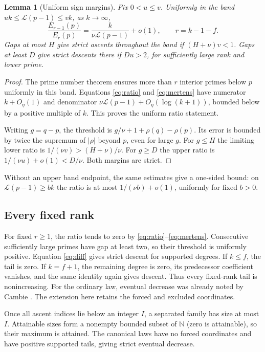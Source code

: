 \documentclass[11pt]{article}
\newtheorem{lemma}[theorem]{Lemma}
\theoremstyle{definition}
\newcommand{\LL}{\mathcal L}
\newcommand{\N}{\mathbb N}
\begin{document}
\begin{lemma}[Uniform sign margins]\label{lem:bands}
Fix $0<u\le v$. Uniformly in the band
$uk\le\LL(p-1)\le vk$, as $k\to\infty$,
\[
 \frac{E_{r-1}(p)}{E_r(p)}
       =\frac{k}{\nu\LL(p-1)}+o(1),\qquad r=k-1-f.
\]
Gaps at most $H$ give strict ascents throughout the band if
$(H+\nu)v<1$. Gaps at least $D$ give strict descents there if
$Du>2$, for sufficiently large rank and lower prime.
\end{lemma}
\begin{proof}
The prime number theorem ensures more than $r$ interior primes
below $p$ uniformly in this band. Equations \eqref{eq:ratio} and
\eqref{eq:mertens} have numerator $k+O_\eta(1)$ and denominator
$\nu\LL(p-1)+O_\eta(\log(k+1))$, bounded below by a positive
multiple of $k$. This proves the uniform ratio statement.

Writing $g=q-p$, the threshold is
$g/\nu+1+\rho(q)-\rho(p)$. Its error is bounded by twice the
supremum of $|\rho|$ beyond $p$, even for large $g$.
For $g\le H$ the limiting lower ratio is
$1/(\nu v)>(H+\nu)/\nu$.
For $g\ge D$ the upper ratio is
$1/(\nu u)+o(1)<D/\nu$. Both margins are strict.
\end{proof}
Without an upper band endpoint, the same estimates give a
one-sided bound: on $\LL(p-1)\ge bk$ the ratio is at most
$1/(\nu b)+o(1)$, uniformly for fixed $b>0$.

\subsection{Every fixed rank}
For fixed $r\ge1$, the ratio tends to zero by
\eqref{eq:ratio}--\eqref{eq:mertens}. Consecutive sufficiently large
primes have gap at least two, so their threshold is uniformly
positive. Equation \eqref{eq:diff} gives strict descent for
supported degrees. If $k\le f$, the tail is zero. If $k=f+1$,
the remaining degree is zero, its predecessor coefficient vanishes,
and the same identity again gives descent.
Thus every fixed-rank tail is nonincreasing. For the ordinary law,
eventual decrease was already noted by Cambie \cite[\S3]{Cambie}.
The extension here retains the forced and excluded coordinates.

Once all ascent indices lie below an integer $I$, a separated
family has size at most $I$. Attainable sizes form a nonempty
bounded subset of $\N$ (zero is attainable), so their maximum
is attained. The canonical laws have no forced coordinates
and have positive supported tails, giving strict eventual decrease.
\end{document}
